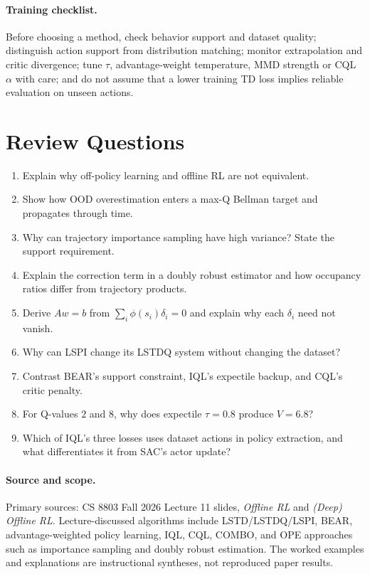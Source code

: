 \paragraph{Training checklist.}
Before choosing a method, check behavior support and dataset quality; distinguish action support from distribution matching; monitor extrapolation and critic divergence; tune $\tau$, advantage-weight temperature, MMD strength or CQL $\alpha$ with care; and do not assume that a lower training TD loss implies reliable evaluation on unseen actions.

\section{Review Questions}
\begin{enumerate}
\item Explain why off-policy learning and offline RL are not equivalent.
\item Show how OOD overestimation enters a max-Q Bellman target and propagates through time.
\item Why can trajectory importance sampling have high variance? State the support requirement.
\item Explain the correction term in a doubly robust estimator and how occupancy ratios differ from trajectory products.
\item Derive $Aw=b$ from $\sum_i\phi(s_i)\delta_i=0$ and explain why each $\delta_i$ need not vanish.
\item Why can LSPI change its LSTDQ system without changing the dataset?
\item Contrast BEAR's support constraint, IQL's expectile backup, and CQL's critic penalty.
\item For Q-values $2$ and $8$, why does expectile $\tau=0.8$ produce $V=6.8$?
\item Which of IQL's three losses uses dataset actions in policy extraction, and what differentiates it from SAC's actor update?
\end{enumerate}

\paragraph{Source and scope.}
Primary sources: CS 8803 Fall 2026 Lecture 11 slides, \emph{Offline RL} and \emph{(Deep) Offline RL}. Lecture-discussed algorithms include LSTD/LSTDQ/LSPI, BEAR, advantage-weighted policy learning, IQL, CQL, COMBO, and OPE approaches such as importance sampling and doubly robust estimation. The worked examples and explanations are instructional syntheses, not reproduced paper results.
